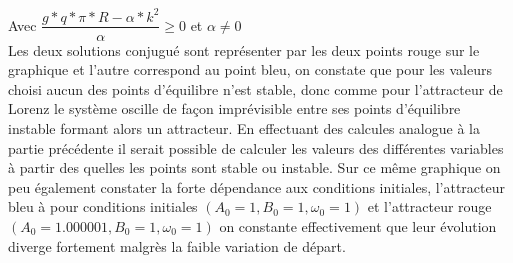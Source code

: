 Avec $\dfrac{g*q*\pi*R-\alpha*k^2}{\alpha} \geq 0$ et $\alpha\neq 0$\\

Les deux solutions conjugué sont représenter par les deux points rouge sur le graphique et l'autre correspond au point bleu, on constate que pour les valeurs choisi aucun des points d'équilibre n'est stable, donc comme pour l'attracteur de Lorenz le système oscille de façon imprévisible entre ses points d'équilibre instable formant alors un attracteur. En effectuant des calcules analogue à la partie précédente il serait possible de calculer les valeurs des différentes variables à partir des quelles les points sont stable ou instable. 
Sur ce même graphique on peu également constater la forte dépendance aux conditions initiales, l'attracteur bleu à pour conditions initiales $(A_0=1,B_0=1,\omega_0=1)$ et l'attracteur rouge $(A_0=1.000001,B_0=1,\omega_0=1)$ on constante effectivement que leur évolution diverge fortement malgrès la faible variation de départ.


